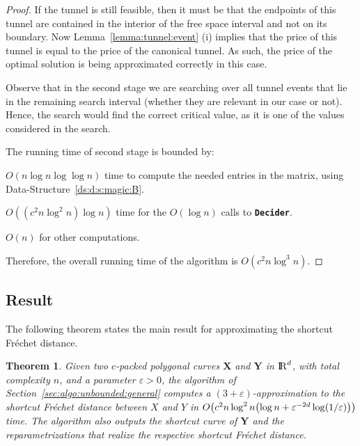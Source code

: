 \documentclass[12pt]{article}
\makeatletter
\newcommand{\AlgorithmI}[1]{{\textcolor[named]{RedViolet}{\texttt{\bf{#1}}}}}
\newcommand{\Algorithm}[1]{{\AlgorithmI{#1}\index{algorithm!#1@{\AlgorithmI{#1}}}}}
\newtheorem{theorem}{Theorem}[section]
\newcommand{\secref}[1]{Section~\ref{sec:#1}}
\newcommand{\thmlab}[1]{{\label{theo:#1}}}
\newcommand{\lemref}[1]{Lemma~\ref{lemma:#1}}
\newcommand{\dsref}[1]{Data-Structure~\ref{ds:#1}}
\newcommand{\Frechet}{Fr\'{e}c{h}e{}t\xspace}\providecommand{\Arr}{\mathop{\mathrm{\EuScript{A}}}}
\newcommand{\SimplifyX}[1]{#1}
\newcommand{\cXBase}{X} \newcommand{\cYBase}{Y} \newcommand{\crvCBase}{{\pi}}
\newcommand{\cX}{\SimplifyX{\cXBase}}
\newcommand{\cXOrig}{\pmb{\cXBase}}
\newcommand{\cY}{\SimplifyX{\cYBase}}
\newcommand{\cYOrig}{\pmb{\cYBase}}
\providecommand{\pth}[2][\!]{#1\left({#2}\right)}
\providecommand{\eps}{{\varepsilon}}\renewcommand{\Re}{{\rm I\!\hspace{-0.025em} R}}
\newcommand{\DeciderFr}{\Algorithm{Decider}\xspace}
\newcommand{\tunnel}{tunnel\xspace}
\numberwithin{figure}{section}
\numberwithin{equation}{section}
\makeatother
\begin{document}
\begin{proof}
    If the tunnel is still feasible, then it must be that the
    endpoints of this \tunnel are contained in the interior of the
    free space interval and not on its boundary.  Now
    \lemref{tunnel:event} (i) implies that the price of this \tunnel
    is equal to the price of the canonical tunnel.  As such, the price
    of the optimal solution is being approximated correctly in this
    case.
    
    
    
    
    Observe that in the second stage we are searching over all tunnel
    events that lie in the remaining search interval (whether they are
    relevant in our case or not).  Hence, the search would find the
    correct critical value, as it is one of the values considered in
    the search.
    
    The running time of second stage is bounded by:
    \begin{compactenum}[(A)]
        \item $O(n \log n \log \log n)$ time to compute the needed
        entries in the matrix, using \dsref{d:s:magic:B}.
        
        \item $O\pth{ \pth[]{c^2 n \log^2 n} \log n}$ time for the
        $O(\log n)$ calls to \DeciderFr.
        
        \item $O(n)$ for other computations.
    \end{compactenum}
    
    Therefore, the overall running time of the algorithm is $O\pth{
       c^2 n\log^3 n}$.
\end{proof}




\subsection{Result}

The following theorem states the main result for approximating the
shortcut \Frechet distance.


\begin{theorem}\thmlab{main}Given two $c$-packed polygonal curves $\cXOrig$ and $\cYOrig$ in
    $\Re^d$, with total complexity $n$, and a parameter $\eps > 0$,
    the algorithm of \secref{algo:unbounded:general} computes a
    $(3+\eps)$-approximation to the shortcut \Frechet distance between
    $\cX$ and $\cY$ in $\RTUnbounded$ time.  The algorithm also
    outputs the shortcut curve of $\cYOrig$ and the reparametrizations
    that realize the respective shortcut \Frechet distance.
\end{theorem}
\end{document}
